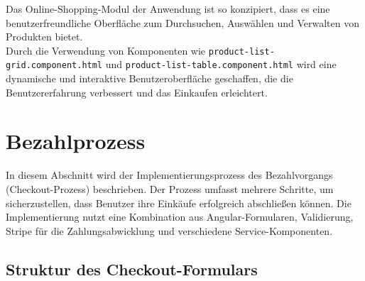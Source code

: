 Das Online-Shopping-Modul der Anwendung ist so konzipiert, dass es eine benutzerfreundliche Oberfläche zum Durchsuchen, Auswählen und Verwalten von Produkten bietet. \\
Durch die Verwendung von Komponenten wie \verb*|product-list-grid.component.html| und \verb*|product-list-table.component.html| wird eine dynamische und interaktive Benutzeroberfläche geschaffen, die die Benutzererfahrung verbessert und das Einkaufen erleichtert.

\section{Bezahlprozess}

In diesem Abschnitt wird der Implementierungsprozess des Bezahlvorgangs (Checkout-Prozess) beschrieben. Der Prozess umfasst mehrere Schritte, um sicherzustellen, dass Benutzer ihre Einkäufe erfolgreich abschließen können. Die Implementierung nutzt eine Kombination aus Angular-Formularen, Validierung, Stripe für die Zahlungsabwicklung und verschiedene Service-Komponenten.

\subsection{Struktur des Checkout-Formulars}
